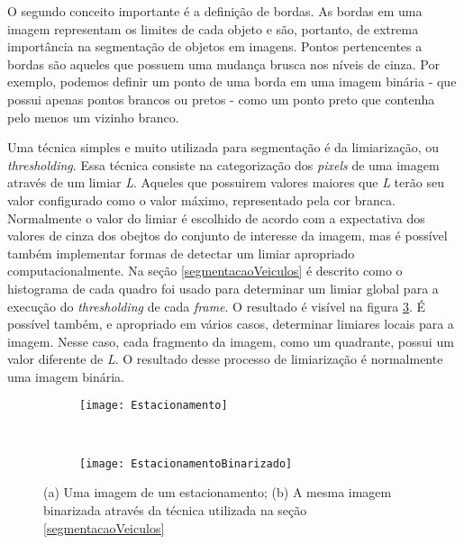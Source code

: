         O segundo conceito importante é a definição de bordas. As bordas em uma imagem representam os limites de cada objeto e são, portanto, de extrema importância na segmentação de objetos em imagens. Pontos pertencentes a bordas são aqueles que possuem uma mudança brusca nos níveis de cinza. Por exemplo, podemos definir um ponto de uma borda em uma imagem binária - que possui apenas pontos brancos ou pretos - como um ponto preto que contenha pelo menos um vizinho branco.\cite{vkl1989jain}

        Uma técnica simples e muito utilizada para segmentação é da limiarização, ou \textit{thresholding}. Essa técnica consiste na categorização dos \textit{pixels} de uma imagem através de um limiar \textit{L}. Aqueles que possuirem valores maiores que \textit{L} terão seu valor configurado como o valor máximo, representado pela cor branca. Normalmente o valor do limiar é escolhido de acordo com a expectativa dos valores de cinza dos obejtos do conjunto de interesse da imagem, mas é possível também implementar formas de detectar um limiar apropriado computacionalmente. Na seção \ref{segmentacaoVeiculos} é descrito como o histograma de cada quadro foi usado para determinar um limiar global para a execução do \textit{thresholding} de cada \textit{frame}. O resultado é visível na figura \ref{LimiarizacaoFig}. É possível também, e apropriado em vários casos, determinar limiares locais para a imagem. Nesse caso, cada fragmento da imagem, como um quadrante, possui um valor diferente de \textit{L}. O resultado desse processo de limiarização é normalmente uma imagem binária.


\begin{figure}
 \centering
\begin{subfigure}{.5\textwidth}
  \centering
  \texttt{[image: Estacionamento]}
  \caption{}
  \label{Limiarizacao:sfig1}
\end{subfigure}\


\begin{subfigure}{.5\textwidth}
  \centering
  \texttt{[image: EstacionamentoBinarizado]}
  \caption{}
  \label{Limiarizacao:sfig2}
\end{subfigure}
\caption{(a) Uma imagem de um estacionamento; (b) A mesma imagem binarizada através da técnica utilizada na seção \ref{segmentacaoVeiculos}}
\label{LimiarizacaoFig}
\end{figure}

